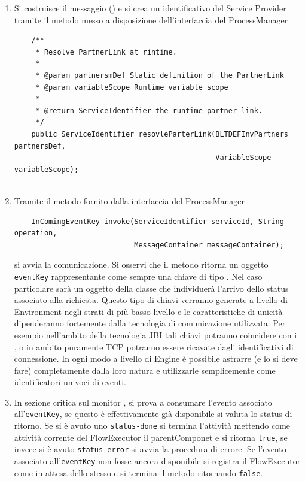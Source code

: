 \begin{enumerate}
  \item Si costruisce il messaggio () e si crea un
  identificativo del Service Provider tramite il metodo messo a disposizione
  dell'interfaccia del ProcessManager
  \lstset{frame=NONE}
  \begin{lstlisting}
  	/**
     * Resolve PartnerLink at rintime.
     * 
     * @param partnersmDef Static definition of the PartnerLink
     * @param variableScope Runtime variable scope
     * 
     * @return ServiceIdentifier the runtime partner link.
     */
    public ServiceIdentifier resovleParterLink(BLTDEFInvPartners partnersDef, 
											   VariableScope variableScope);
    
  \end{lstlisting}  
  
  \item Tramite il metodo fornito dalla interfaccia del ProcessManager
  \begin{lstlisting}
  	InComingEventKey invoke(ServiceIdentifier serviceId, String operation, 
							MessageContainer messageContainer);
  \end{lstlisting}
  si avvia la comunicazione. Si osservi che il metodo ritorna un oggetto
  \texttt{eventKey} rappresentante come sempre una chiave di tipo
  . Nel caso particolare sarà un oggetto della classe
   che individuerà l'arrivo dello status
  associato alla richiesta. Questo tipo di chiavi verranno generate a livello di
  Environment negli strati di più basso livello e le caratteristiche di unicità dipenderanno fortemente dalla tecnologia di comunicazione
 utilizzata. Per esempio nell'ambito della tecnologia JBI tali chiavi potranno
 coincidere con i , o in ambito puramente TCP potranno
 essere ricavate dagli identificativi di connessione. In ogni modo a livello di Engine
 \`e possibile astrarre (e lo si deve fare) completamente dalla loro natura e
 utilizzarle semplicemente come identificatori univoci di eventi.
  
  \item In sezione critica sul monitor , si
  prova a consumare l'evento associato all'\texttt{eventKey}, se questo \`e
  effettivamente già disponibile si valuta lo status di ritorno. Se si \`e
  avuto uno \texttt{status-done} si termina l'attività mettendo come
  attività corrente del FlowExecutor il parentComponet e si ritorna
  \texttt{true}, se invece si \`e avuto \texttt{status-error} si avvia la
  procedura di errore. Se l'evento associato all'\texttt{eventKey} non fosse
  ancora disponibile si registra il FlowExecutor come in attesa dello stesso e
  si termina il metodo  ritornando \texttt{false}.
  

\end{enumerate}
